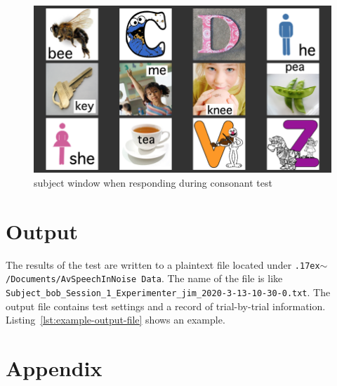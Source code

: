\documentclass[11pt,pdftex,letterpaper]{article}
\newcommand{\mytilde}{\raise.17ex\hbox{$\scriptstyle\mathtt{\sim}$}}
\begin{document}
\begin{figure}
\centering
\includegraphics[width = 0.9\linewidth]{consonant-response-window.png}
\caption{subject window when responding during consonant test}
\label{fig:consonant-response-window}
\end{figure}

\section{Output}
The results of the test are written to a plaintext file located under \texttt{\mytilde/Documents/AvSpeechInNoise Data}. The name of the file is like \texttt{Subject\_bob\_Session\_1\_Experimenter\_jim\_2020-3-13-10-30-0.txt}. The output file contains test settings and a record of trial-by-trial information. Listing~\ref{lst:example-output-file} shows an example.

\noindent\begin{minipage}{\textwidth}

\end{minipage}

\section{Appendix}

\noindent\begin{minipage}{\textwidth}
	
\end{minipage}

\noindent\begin{minipage}{\textwidth}
	
\end{minipage}
\end{document}
